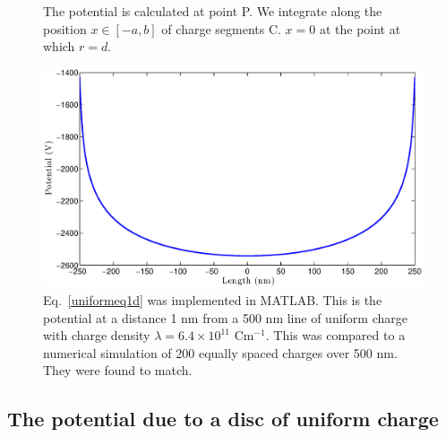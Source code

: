 \message{ !name(report.tex)}\documentclass[]{article}
\begin{document}
\begin{figure}
\centering
{}
\caption{The potential is calculated at point P. We integrate along the position $x \in [-a,b]$ of charge segments C. $x = 0$ at the point at which $r = d$.\label{uniformpotentialdiagram}}
\end{figure}

\begin{figure}
\centering
\includegraphics[width=\textwidth]{1d_Uniform_Potential.eps}
\caption{Eq.~\ref{uniformeq1d} was implemented in MATLAB. This is the potential at a distance 1 nm from a 500 nm line of uniform charge with charge density $\lambda = 6.4 \times 10^{11}$ Cm$^{-1}$. This was compared to a numerical simulation of 200 equally spaced charges over 500 nm. They were found to match. \label{uniformplot}}
\end{figure}

\subsection{The potential due to a disc of uniform charge}
\end{document}
